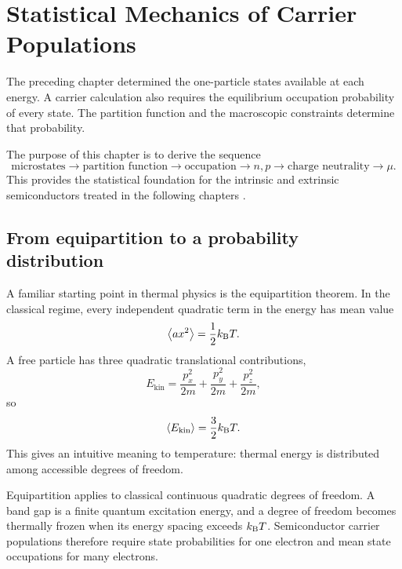 \chapter{Statistical Mechanics of Carrier Populations}
\label{ch:statistical-mechanics-carriers}

The preceding chapter determined the one-particle states available at each
energy.  A carrier calculation also requires the equilibrium occupation
probability of every state.  The partition function and the macroscopic
constraints determine that probability.

The purpose of this chapter is to derive the sequence
\begin{equation}
  \text{microstates}
  \longrightarrow
  \text{partition function}
  \longrightarrow
  \text{occupation}
  \longrightarrow
  n,p
  \longrightarrow
  \text{charge neutrality}
  \longrightarrow
  \mu.
  \label{eq:statistical-mechanics-carrier-sequence}
\end{equation}
This provides the statistical foundation for the intrinsic and extrinsic
semiconductors treated in the following chapters
\cite{kittel2005,szeLee2012,szeNg2007,rudan2015}.

\section{From equipartition to a probability distribution}

A familiar starting point in thermal physics is the equipartition theorem.  In
the classical regime, every independent quadratic term in the energy has mean
value
\begin{equation}
  \left\langle a x^2\right\rangle
  =\frac12k_{\mathrm B} T.
  \label{eq:classical-equipartition-quadratic-term}
\end{equation}
A free particle has three quadratic translational contributions,
\begin{equation}
  E_{\mathrm{kin}}
  =\frac{p_x^2}{2m}
   +\frac{p_y^2}{2m}
   +\frac{p_z^2}{2m},
  \label{eq:three-dimensional-classical-kinetic-energy}
\end{equation}
so
\begin{equation}
  \langle E_{\mathrm{kin}}\rangle
  =\frac32k_{\mathrm B} T.
  \label{eq:classical-translational-equipartition}
\end{equation}
This gives an intuitive meaning to temperature: thermal energy is distributed
among accessible degrees of freedom.

Equipartition applies to classical continuous quadratic degrees of freedom.  A
band gap is a finite quantum excitation energy, and a degree of freedom becomes
thermally frozen when its energy spacing exceeds $k_{\mathrm B} T$.  Semiconductor carrier
populations therefore require state probabilities for one electron and mean
state occupations for many electrons.

